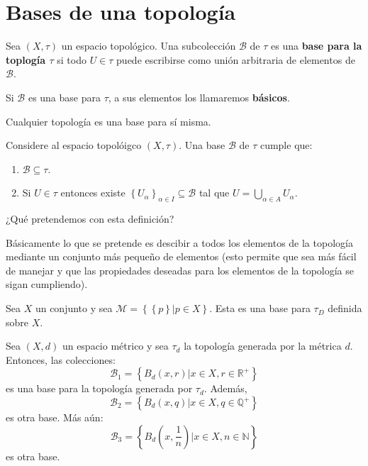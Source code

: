 \documentclass[12pt]{report}
\theoremstyle{largebreak}
\begin{document}
    \section{Bases de una topología}

    \begin{mydef}
        Sea $(X,\tau)$ un espacio topológico. Una subcolección $\mathcal{B}$ de $\tau$ es una \textbf{base para la toplogía $\tau$} si todo $U\in \tau$ puede escribirse como unión arbitraria de elementos de $\mathcal{B}$.

        Si $\mathcal{B}$ es una base para $\tau$, a sus elementos los llamaremos \textbf{básicos}.
    \end{mydef}

    \begin{obs}
        Cualquier topología es una base para sí misma.
    \end{obs}

    Considere al espacio topolóigco $(X,\tau)$. Una base $\mathcal{B}$ de $\tau$ cumple que:
    \begin{enumerate}
        \item $\mathcal{B}\subseteq\tau$.
        \item Si $U\in\tau$ entonces existe $\left\{U_\alpha\right\}_{\alpha\in I}\subseteq\mathcal{B}$ tal que $U=\bigcup_{\alpha\in A}U_\alpha$.
    \end{enumerate}

    ¿Qué pretendemos con esta definición?

    Básicamente lo que se pretende es descibir a todos los elementos de la topología mediante un conjunto más pequeño de elementos (esto permite que sea más fácil de manejar y que las propiedades deseadas para los elementos de la topología se sigan cumpliendo).

    \begin{exa}
        Sea $X$ un conjunto y sea $\mathcal{M}=\left\{\left\{p\right\}\big| p\in X \right\}$. Esta es una base para $\tau_D$ definida sobre $X$.
    \end{exa}

    \begin{exa}
        Sea $(X,d)$ un espacio métrico y sea $\tau_d$ la topología generada por la métrica $d$. Entonces, las colecciones:
        \begin{equation*}
            \mathcal{B}_1 =\left\{B_d(x,r)\big| x\in X, r\in\mathbb{R}^+ \right\}
        \end{equation*}
        es una base para la topología generada por $\tau_d$. Además,
        \begin{equation*}
            \mathcal{B}_2=\left\{B_d(x,q)\big| x\in X, q\in\mathbb{Q}^+ \right\}
        \end{equation*}
        es otra base. Más aún:
        \begin{equation*}
            \mathcal{B}_3=\left\{B_d\left(x,\frac{1}{n}\right) \big| x\in X, n\in\mathbb{N} \right\}
        \end{equation*}
        es otra base.
    \end{exa}
\end{document}
